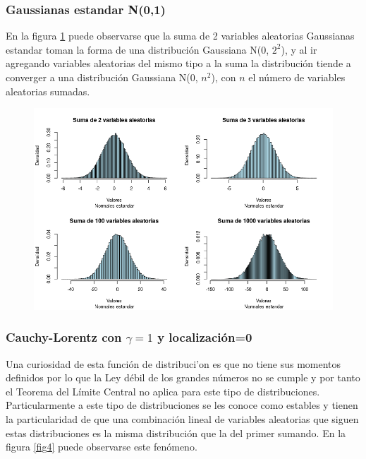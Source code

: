 \documentclass[paper=letter, fontsize=11pt]{scrartcl}
\numberwithin{equation}{section} %
\numberwithin{figure}{section} %
\numberwithin{table}{section} %
\begin{document}
\subsubsection{Gaussianas estandar N(0,1)}
En la figura \ref{fig3} puede observarse que la suma de 2 variables aleatorias Gaussianas estandar toman la forma de una distribuci\'on Gaussiana N(0, $2^2$), y al ir agregando variables aleatorias del mismo tipo a la suma la distribuci\'on tiende a converger a una distribuci\'on Gaussiana N(0, $n^2$), con $n$ el n\'umero de variables aleatorias sumadas. 

\begin{figure}[htpb]
\centering
  \includegraphics[height=.5\linewidth]{normales.png}
  \label{fig3}
\end{figure}

\subsubsection{Cauchy-Lorentz con $\gamma=1$ y localizaci\'on=0}
Una curiosidad de esta funci\'on de distribuci'on es que no tiene sus momentos definidos por lo que la Ley d\'ebil de los grandes n\'umeros no se cumple y por tanto el Teorema del L\'imite Central no aplica para este tipo de distribuciones. Particularmente a este tipo de distribuciones se les conoce como estables y tienen la particularidad de que una combinaci\'on lineal de variables aleatorias que siguen estas distribuciones es la misma distribuci\'on que la del primer sumando. En la figura \ref{fig4} puede observarse este fen\'omeno.
\end{document}
